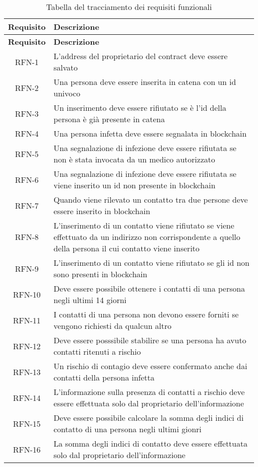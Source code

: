 \newpage

\renewcommand{\arraystretch}{3}

\begin{center}
		\begin{longtable}{| c | p{30em} |}
			\caption{Tabella del tracciamento dei requisiti funzionali}
			\label{tab:requisiti-funzionali}\\
			\hline
			\textbf{Requisito} & \centering\textbf{Descrizione}\\
			\endfirsthead
			\hline
			\textbf{Requisito} & \centering\textbf{Descrizione}\\
			\endhead
			\endfoot
			
			\hline
			RFN-1     & L'address del proprietario del contract deve essere salvato\\
			\hline
			RFN-2     & Una persona deve essere inserita in catena con un id univoco \\
			\hline
			RFN-3     & Un inserimento deve essere rifiutato se è l'id della persona è già presente in catena \\
			\hline
			RFN-4     & Una persona infetta deve essere segnalata in blockchain \\
			\hline
			RFN-5     & Una segnalazione di infezione deve essere rifiutata se non è stata invocata da un medico autorizzato \\
			\hline
			RFN-6     & Una segnalazione di infezione deve essere rifiutata se viene inserito un id non presente in blockchain \\
			\hline
			RFN-7     & Quando viene rilevato un contatto tra due persone deve essere inserito in blockchain\\
			\hline
			RFN-8     & L'inserimento di un contatto viene rifiutato se viene effettuato da un indirizzo non corrispondente a quello della persona il cui contatto viene inserito \\
			\hline
			RFN-9     & L'inserimento di un contatto viene rifiutato se gli id non sono presenti in blockchain \\
			\hline
			RFN-10   & Deve essere possibile ottenere i contatti di una persona negli ultimi 14 giorni \\
			\hline
			RFN-11   & I contatti di una persona non devono essere forniti se vengono richiesti da qualcun altro\\
			\hline
			RFN-12   & Deve essere posssibile stabilire se una persona ha avuto contatti ritenuti a rischio \\
			\hline
			RFN-13   & Un rischio di contagio deve essere confermato anche dai contatti della persona infetta \\
			\hline
			RFN-14   & L'informazione sulla presenza di contatti a rischio deve essere effettuata solo dal proprietario dell'informazione \\
			\hline
			RFN-15   & Deve essere possibile calcolare la somma degli indici di contatto di una persona negli ultimi gionri\\
			\hline
			RFN-16   & La somma degli indici di contatto deve essere effettuata solo dal proprietario dell'informazione \\
			\hline
					


\end{longtable}
\end{center}
